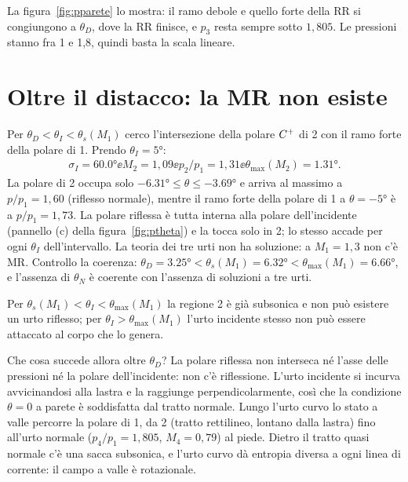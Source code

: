 
La figura~\ref{fig:pparete} lo mostra: il ramo debole e quello forte della RR si congiungono a $\theta_D$, dove la RR
finisce, e $p_3$ resta sempre sotto $1{,}805$. Le pressioni stanno fra 1 e 1,8, quindi basta la scala lineare.

\section*{Oltre il distacco: la MR non esiste}
Per $\theta_D<\theta_I<\theta_s(M_1)$ cerco l'intersezione della polare $C^{+}$ di 2 con il ramo forte della polare di 1.
Prendo $\theta_I=\ang{5}$:
\begin{gather*}
\sigma_I=\ang{60.0}\ee M_2=1{,}09\ee p_2/p_1=1{,}31\ee \theta_{\max}(M_2)=\ang{1.31}.
\end{gather*}
La polare di 2 occupa solo $-\ang{6.31}\le\theta\le-\ang{3.69}$ e arriva al massimo a $p/p_1=1{,}60$ (riflesso
normale), mentre il ramo forte della polare di 1 a $\theta=-\ang{5}$ è a $p/p_1=1{,}73$. La polare riflessa è tutta
interna alla polare dell'incidente (pannello (c) della figura~\ref{fig:ptheta}) e la tocca solo in 2; lo stesso
accade per ogni $\theta_I$ dell'intervallo. La teoria dei tre urti non ha soluzione: a $M_1=1{,}3$ non c'è MR.
Controllo la coerenza: $\theta_D=\ang{3.25}<\theta_s(M_1)=\ang{6.32}<\theta_{\max}(M_1)=\ang{6.66}$, e l'assenza di
$\theta_N$ è coerente con l'assenza di soluzioni a tre urti.

Per $\theta_s(M_1)<\theta_I<\theta_{\max}(M_1)$ la regione 2 è già subsonica e non può esistere un urto riflesso; per
$\theta_I>\theta_{\max}(M_1)$ l'urto incidente stesso non può essere attaccato al corpo che lo genera.

Che cosa succede allora oltre $\theta_D$? La polare riflessa non interseca né l'asse delle pressioni né la polare
dell'incidente: non c'è riflessione. L'urto incidente si incurva avvicinandosi alla lastra e la raggiunge
perpendicolarmente, così che la condizione $\theta=0$ a parete è soddisfatta dal tratto normale. Lungo l'urto curvo
lo stato a valle percorre la polare di 1, da 2 (tratto rettilineo, lontano dalla lastra) fino all'urto normale
($p_4/p_1=1{,}805$, $M_4=0{,}79$) al piede. Dietro il tratto quasi normale c'è una sacca subsonica, e l'urto curvo
dà entropia diversa a ogni linea di corrente: il campo a valle è rotazionale.

